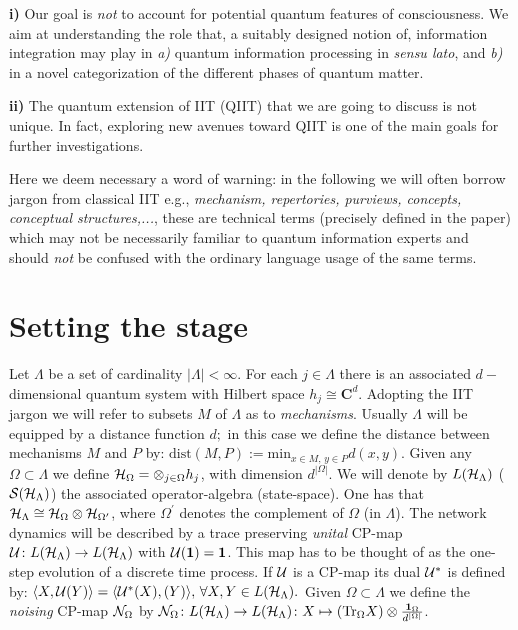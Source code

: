 \documentclass[aps,pra,groupaddress]{revtex4-1}
\begin{document}
 {\bf{i)}} Our goal is {\em{not}} to account for potential quantum features of consciousness. We aim at understanding the role that, a suitably designed notion of,  information integration may play in {\em{a)}} quantum information processing in {\em{sensu lato}}, and {\em{b)}}  in a novel categorization of the different phases of quantum matter.

{\bf{ii)}} The quantum extension of IIT  (QIIT) that we are going to discuss is not unique. In fact, exploring new avenues toward QIIT  is one of the main goals for further investigations.

Here we deem necessary a word of warning: in the following we will often borrow jargon from  classical IIT e.g., {\em{mechanism, repertories, purviews, concepts, conceptual structures,...}}, these are technical terms  (precisely defined in the paper) which may  not be necessarily familiar to quantum information experts  and should {\em{not}} be confused with the ordinary language usage of the same terms.

\section{Setting the stage}
Let $\Lambda$ be a set of cardinality $|\Lambda|<\infty$.
For each $j\in\Lambda$ there is an associated $d-$dimensional quantum
system with Hilbert space $h_j \cong {\mathbf{C}}^d$.
Adopting the IIT jargon we will refer to subsets $M$ of $\Lambda$ as to {\em{mechanisms}}.
Usually $\Lambda$ will be equipped by a distance function $d;$ in this case we define the distance between mechanisms $M$ and $P$ by:
${\mathrm{dist}}(M, P):={\mathrm{min}}_{x\in M,\, y\in P} d(x,y).$
Given any $\Omega\subset\Lambda$ we define 
${\cal H}_\Omega=\otimes_{j\in\Omega} h_j$, with dimension
$d^{|\Omega|}$.
We will denote by $L({\cal H}_\Lambda)$  (${\cal S}({\cal H}_\Lambda)$) the associated
operator-algebra (state-space).
One has that
${\cal H}_\Lambda\cong {\cal H}_\Omega \otimes {\cal H}_{\Omega^\prime}$,
where $\Omega^\prime$ denotes the complement of $\Omega$ (in
$\Lambda$).
The network dynamics will be described by a trace preserving {\em{unital}} CP-map 
${\cal U}\colon L({\cal H}_\Lambda) \rightarrow  L({\cal H}_\Lambda)$
with ${\cal U}({\mathbf{1}})={\mathbf{1}}$.
This map has to be thought of as the one-step evolution of a discrete
time process. If $\cal U$ is a CP-map its dual ${\cal U}^*$ is defined by: $\langle X, {\cal U}(Y)\rangle= \langle {\cal U}^*(X), (Y)\rangle,\,\forall X, Y\in L({\cal H}_\Lambda).$
Given $\Omega\subset\Lambda$ we define the {\em{noising}} CP-map
${\cal N}_\Omega$ by
${\cal N}_\Omega\colon L({\cal H}_\Lambda)\rightarrow L({\cal H}_\Lambda)\colon X\mapsto ({\mathrm{Tr}}_{\Omega} X) \otimes
\frac{ {\mathbf{1}}_{\Omega}} {d^{|\Omega|}} \label{noising}$. %
\end{document}
